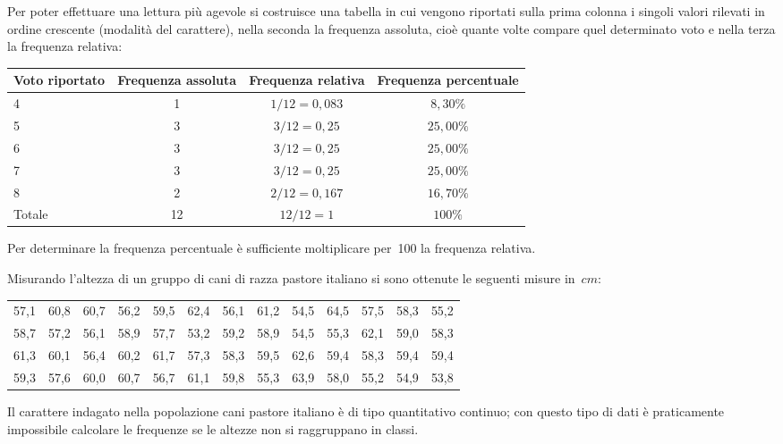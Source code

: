 \begin{exrig}
\begin{esempio}
Per poter effettuare una lettura più agevole si costruisce una tabella in cui vengono riportati sulla prima colonna i singoli valori rilevati in ordine crescente (modalità del carattere),
nella seconda la frequenza assoluta, cioè quante volte compare quel determinato voto e nella terza la frequenza relativa:

\begin{center}
\begin{tabular}{lccc}
\toprule
Voto riportato & Frequenza assoluta & Frequenza relativa & Frequenza percentuale \\
\midrule
4 & 1 & $1/12=0,083$ & $8,30\%$ \\
5 & 3 & $3/12=0,25$ & $25,00\%$ \\
6 & 3 & $3/12=0,25$ & $25,00\%$ \\
7 & 3 & $3/12=0,25$ & $25,00\%$ \\
8 & 2 & $2/12=0,167$ & $16,70\%$ \\
Totale & 12 & $12/12=1$ & $100\%$ \\
\bottomrule
\end{tabular}
\end{center}

Per determinare la frequenza percentuale è sufficiente moltiplicare per~100 la frequenza relativa.
 \end{esempio}

 \begin{esempio}
Misurando l'altezza di un gruppo di cani di razza pastore italiano si sono ottenute le seguenti misure in~$\unit{cm}$:
\begin{center}
 \begin{tabular}{ccccccccccccc}
57,1 & 60,8 & 60,7 & 56,2 & 59,5 & 62,4 & 56,1 & 61,2 & 54,5 & 64,5 & 57,5 & 58,3 & 55,2\\
58,7 & 57,2 & 56,1 & 58,9 & 57,7 & 53,2 & 59,2 & 58,9 & 54,5 & 55,3 & 62,1 & 59,0 & 58,3\\
61,3 & 60,1 & 56,4 & 60,2 & 61,7 & 57,3 & 58,3 & 59,5 & 62,6 & 59,4 & 58,3 & 59,4 & 59,4\\
59,3 & 57,6 & 60,0 & 60,7 & 56,7 & 61,1 & 59,8 & 55,3 & 63,9 & 58,0 & 55,2 & 54,9 & 53,8\\
 \end{tabular}
\end{center}
Il carattere indagato nella popolazione cani pastore italiano è di tipo quantitativo continuo; con questo tipo di dati è praticamente impossibile
calcolare le frequenze se le altezze non si raggruppano in classi.


\end{esempio}
\end{exrig}
